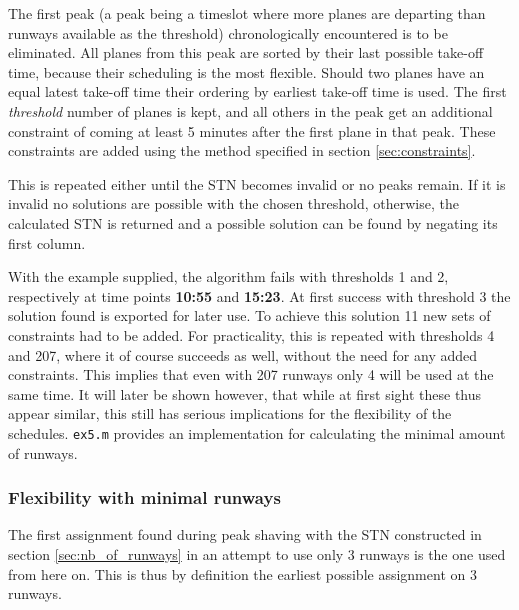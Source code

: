 \documentclass[10pt,a4paper]{article}
\begin{document}
The first peak (a peak being a timeslot where more planes are departing than runways available as the threshold) chronologically encountered is to be eliminated. All planes from this peak are sorted by their last possible take-off time, because their scheduling is the most flexible. Should two planes have an equal latest take-off time their ordering by earliest take-off time is used. The first \emph{threshold} number of planes is kept, and all others in the peak get an additional constraint of coming at least 5 minutes after the first plane in that peak. These constraints are added using the method specified in section \ref{sec:constraints}.

This is repeated either until the STN becomes invalid or no peaks remain. If it is invalid no solutions are possible with the chosen threshold, otherwise, the calculated STN is returned and a possible solution can be found by negating its first column.

With the example supplied, the algorithm fails with thresholds 1 and 2, respectively at time points \textbf{10:55} and  \textbf{15:23}. At first success with threshold 3 the solution found is exported for later use. To achieve this solution 11 new sets of constraints had to be added. For practicality, this is repeated with thresholds 4 and 207, where it of course succeeds as well, without the need for any added constraints. This implies that even with 207 runways only 4 will be used at the same time. It will later be shown however, that while at first sight these thus appear similar, this still has serious implications for the flexibility of the schedules. \texttt{ex5.m} provides an implementation for calculating the minimal amount of runways. 

\subsubsection{Flexibility with minimal runways}
The first assignment found during peak shaving with the STN constructed in section \ref{sec:nb_of_runways} in an attempt to use only 3 runways is the one used from here on. This is thus by definition the earliest possible assignment on 3 runways.
\end{document}

